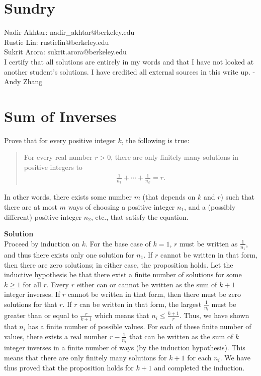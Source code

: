 \documentclass[11pt]{article}
\newcommand*{\Question}[1]{\section{#1}}
\newenvironment{Answer}{\vspace{10pt}\begin{mdframed}\textbf{Solution}\\}{\end{mdframed}\vfill\pagebreak[3]}
\newenvironment{Answer}{\vspace{10pt}}{\vfill\pagebreak[3]}
\begin{document}
\Question{Sundry} 
\vspace{10pt}
Nadir Akhtar: nadir\_akhtar@berkeley.edu\\
Rustie Lin: rustielin@berkeley.edu\\
Sukrit Arora: sukrit.arora@berkeley.edu\\

I certify that all solutions are entirely in my words and that I have not looked at another student’s
solutions. I have credited all external sources in this write up. - Andy Zhang

\Question{Sum of Inverses}

Prove that for every positive integer $k$, the following is true:\begin{quote}For every real number $r>0$, there are only finitely many solutions in positive integers to
\begin{align*}
\frac{1}{n_1}+\cdots+\frac{1}{n_k}=r.
\end{align*}
\end{quote}In other words, there exists some number $m$ (that depends on $k$ and $r$) such that there are at most $m$ ways of choosing a positive integer $n_1$, and a (possibly different) positive integer $n_2$, etc., that satisfy the equation.

\begin{Answer}
Proceed by induction on $k$. For the base case of $k=1$, $r$ must be written as $\frac{1}{n_1}$, and thus there exists only one solution for $n_1$. If $r$ cannot be written in that form, then there are zero solutions; in either case, the proposition holds. Let the inductive hypothesis be that there exist a finite number of solutions for some $k \geq 1$ for all $r$. Every $r$ either can or cannot be written as the sum of $k+1$ integer inverses. If $r$ cannot be written in that form, then there must be zero solutions for that $r$. If $r$ can be written in that form, the largest $\frac{1}{n_i}$ must be greater than or equal to $\frac{r}{k+1}$ which means that $n_i\leq \frac{k+1}{r}$. Thus, we have shown that $n_i$ has a finite number of possible values. For each of these finite number of values, there exists a real number $r-\frac{1}{n_i}$ that can be written as the sum of $k$ integer inverses in a finite number of ways (by the induction hypothesis). This means that there are only finitely many solutions for $k+1$ for each $n_i$. We have thus proved that the proposition holds for $k+1$ and completed the induction.
\end{Answer}
\end{document}
